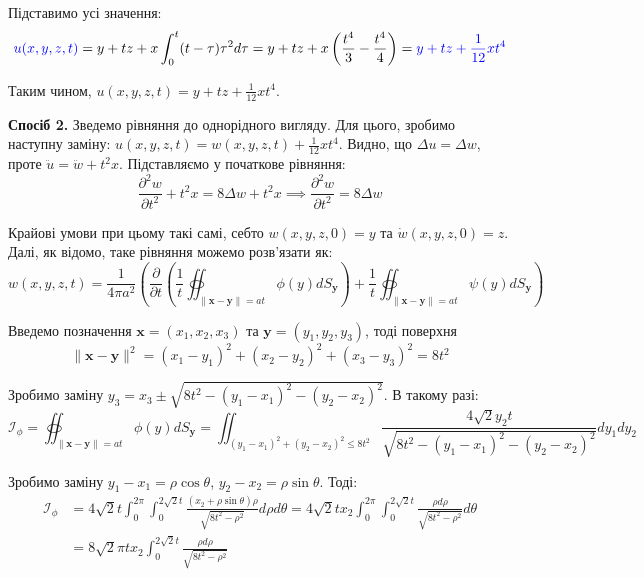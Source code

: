 \documentclass{hw_template}
\begin{document}
Підставимо усі значення:
\begin{equation*}
    \textcolor{blue}{u(x,y,z,t)} = y + tz + x\int_0^t (t-\tau)\tau^2 d\tau = y + tz + x\left(\frac{t^4}{3} - \frac{t^4}{4}\right) = \textcolor{blue}{y+tz+\frac{1}{12}xt^4}
\end{equation*}

Таким чином, $\boxed{u(x,y,z,t) = y+tz+\frac{1}{12}xt^4}$.

\textbf{Спосіб 2.} Зведемо рівняння до однорідного вигляду. Для цього, зробимо
наступну заміну: $u(x,y,z,t)=w(x,y,z,t)+\frac{1}{12}xt^4$. Видно, що $\Delta
u=\Delta w$, проте $\ddot{u} = \ddot{w} + t^2x$. Підставляємо у початкове
рівняння:
\begin{equation*}
    \frac{\partial^2 w}{\partial t^2} + t^2x = 8\Delta w + t^2x \implies \frac{\partial^2 w}{\partial t^2} = 8\Delta w
\end{equation*}

Крайові умови при цьому такі самі, себто $w(x,y,z,0)=y$ та $\dot{w}(x,y,z,0)=z$.
Далі, як відомо, таке рівняння можемо розв'язати як:
\begin{equation*}
    w(x,y,z,t) = \frac{1}{4\pi a^2}\left(\frac{\partial}{\partial t}\left(\frac{1}{t}\oiint_{\|\mathbf{x}-\mathbf{y}\|=at} \phi(y)dS_{\mathbf{y}}\right) + \frac{1}{t}\oiint_{\|\mathbf{x}-\mathbf{y}\|=at}\psi(y)dS_{\mathbf{y}}\right)
\end{equation*}

Введемо позначення $\mathbf{x}=(x_1,x_2,x_3)$ та $\mathbf{y}=(y_1,y_2,y_3)$, тоді поверхня
\begin{equation*}
    \|\mathbf{x}-\mathbf{y}\|^2 = (x_1-y_1)^2 + (x_2-y_2)^2 + (x_3-y_3)^2 = 8t^2
\end{equation*}

Зробимо заміну $y_3=x_3 \pm \sqrt{8t^2 - (y_1-x_1)^2 - (y_2-x_2)^2}$. В такому разі:
\begin{equation*}
    \mathcal{I}_{\phi} = \oiint_{\|\mathbf{x}-\mathbf{y}\|=at} \phi(y)dS_{\mathbf{y}} = \iint_{(y_1-x_1)^2+(y_2-x_2)^2 \leq 8t^2} \frac{4\sqrt{2}y_2 t}{\sqrt{8t^2-(y_1-x_1)^2-(y_2-x_2)^2}} dy_1dy_2
\end{equation*}

Зробимо заміну $y_1-x_1=\rho\cos\theta$, $y_2-x_2=\rho\sin\theta$. Тоді:
\begin{align*}
    \mathcal{I}_{\phi} &= 4\sqrt{2}t \int_0^{2\pi}\int_0^{2\sqrt{2}t}\frac{(x_2+\rho\sin\theta)\rho}{\sqrt{8t^2-\rho^2}}d\rho d\theta = 4\sqrt{2}t x_2\int_0^{2\pi}\int_0^{2\sqrt{2}t} \frac{\rho d\rho}{\sqrt{8t^2-\rho^2}}d\theta \\ &= 8\sqrt{2}\pi tx_2 \int_0^{2\sqrt{2}t}\frac{\rho d\rho}{\sqrt{8t^2-\rho^2}}
\end{align*}
\end{document}
